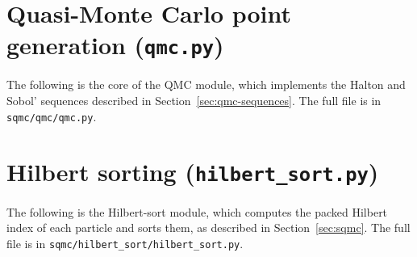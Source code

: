 \section{Quasi-Monte Carlo point generation (\texttt{qmc.py})}
\label{app:qmc-code}

The following is the core of the QMC module, which implements the Halton and Sobol' sequences described in Section~\ref{sec:qmc-sequences}. The full file is in \texttt{sqmc/qmc/qmc.py}.

% 

\section{Hilbert sorting (\texttt{hilbert\_sort.py})}
\label{app:hilbert-code}

The following is the Hilbert-sort module, which computes the packed Hilbert index of each particle and sorts them, as described in Section~\ref{sec:sqmc}. The full file is in \texttt{sqmc/hilbert\_sort/hilbert\_sort.py}.

% 
